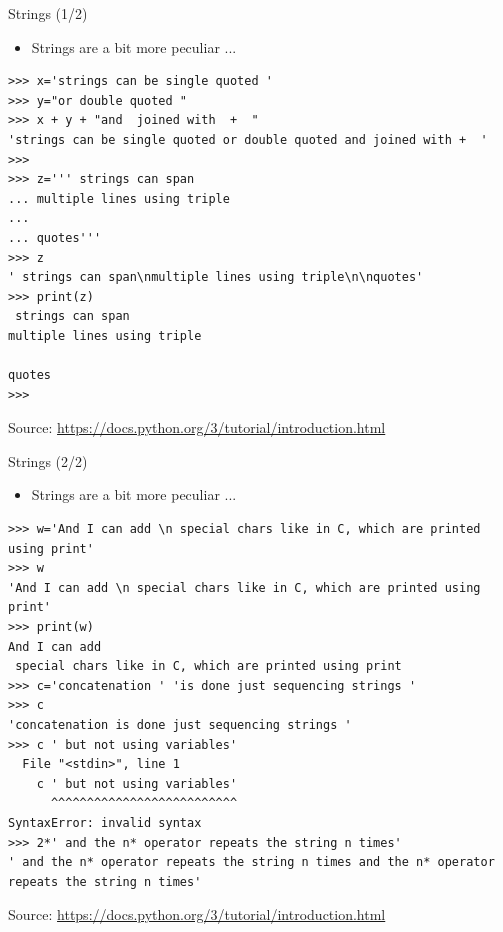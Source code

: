 \documentclass{beamer}
\begin{document}
\begin{frame}[fragile]
{\centerline{Strings (1/2)}}
\begin{itemize}
    \item Strings are a bit more peculiar  ...
\end{itemize} 
\begin{lstlisting}[style=myPythonStyle]
>>> x='strings can be single quoted '
>>> y="or double quoted "
>>> x + y + "and  joined with  +  "
'strings can be single quoted or double quoted and joined with +  '
>>> 
>>> z=''' strings can span
... multiple lines using triple
... 
... quotes'''
>>> z
' strings can span\nmultiple lines using triple\n\nquotes'
>>> print(z)
 strings can span
multiple lines using triple

quotes
>>> 
\end{lstlisting}
\begin{center}
\tiny Source: \url{https://docs.python.org/3/tutorial/introduction.html}
\end{center}

\end{frame}

\begin{frame}[fragile]
{\centerline{Strings (2/2)}}
\begin{itemize}
    \item Strings are a bit more peculiar  ...
\end{itemize} 
\begin{lstlisting}[style=myPythonStyle]
>>> w='And I can add \n special chars like in C, which are printed using print'
>>> w
'And I can add \n special chars like in C, which are printed using print'
>>> print(w)
And I can add 
 special chars like in C, which are printed using print
>>> c='concatenation ' 'is done just sequencing strings '
>>> c
'concatenation is done just sequencing strings '
>>> c ' but not using variables'
  File "<stdin>", line 1
    c ' but not using variables'
      ^^^^^^^^^^^^^^^^^^^^^^^^^^
SyntaxError: invalid syntax
>>> 2*' and the n* operator repeats the string n times'
' and the n* operator repeats the string n times and the n* operator repeats the string n times'
\end{lstlisting}
\begin{center}
\tiny Source: \url{https://docs.python.org/3/tutorial/introduction.html}
\end{center}

\end{frame}
\end{document}
